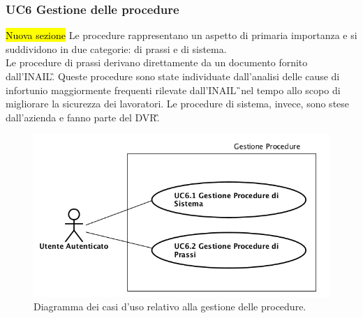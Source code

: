 	\subsubsection{UC6 Gestione delle procedure}
		\label{section:UC6}
		\hl{Nuova sezione}
		Le procedure rappresentano un aspetto di primaria importanza e si suddividono in due categorie: di prassi e di sistema. \\
		Le procedure di prassi derivano direttamente da un documento fornito dall'\gls{INAIL}\G. Queste procedure sono state individuate dall'analisi delle cause di infortunio maggiormente frequenti rilevate dall'\gls{INAIL}\G\ nel tempo allo scopo di migliorare la sicurezza dei lavoratori.
		Le procedure di sistema, invece, sono stese dall'azienda e fanno parte del \gls{DVR}\G. 
		\begin{figure}[H]
			\begin{center}
				\includegraphics[width=12cm]{Pics/UC6GestioneProcedure.png}
				\caption{Diagramma dei casi d'uso relativo alla gestione delle procedure.}
				\label{fig:UC6_Procedure}
			\end{center}
		\end{figure}
		
